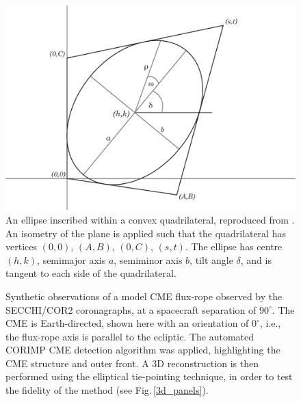 \documentclass[preprint2]{aastex}
\begin{document}
\begin{figure}[t]
\centerline{\includegraphics[width=\linewidth, scale=0.25, clip=true, trim=150 0 200 0]{images/ellipseinscribed.pdf}}
\caption{An ellipse inscribed within a convex quadrilateral, reproduced from \citet{2010NatCo...1E..74B}. An isometry of the plane is applied such that the quadrilateral has vertices $(0,0)$, $(A,B)$, $(0,C)$, $(s,t)$. The ellipse has centre $(h,k)$, semimajor axis $a$, semiminor axis $b$, tilt angle $\delta$, and is tangent to each side of the quadrilateral.}
\label{ellipseinscribed}
\end{figure}

\begin{figure}[t]
\caption{Synthetic observations of a model CME flux-rope observed by the SECCHI/COR2 coronagraphs, at a spacecraft separation of $90^{\circ}$. The CME is Earth-directed, shown here with an orientation of $0^{\circ}$, i.e., the flux-rope axis is parallel to the ecliptic. The automated CORIMP CME detection algorithm was applied, highlighting the CME structure and outer front. A 3D reconstruction is then performed using the elliptical tie-pointing technique, in order to test the fidelity of the method (see Fig.\,\ref{3d_panels}).}
\label{dets_splice}
\end{figure}
\end{document}
